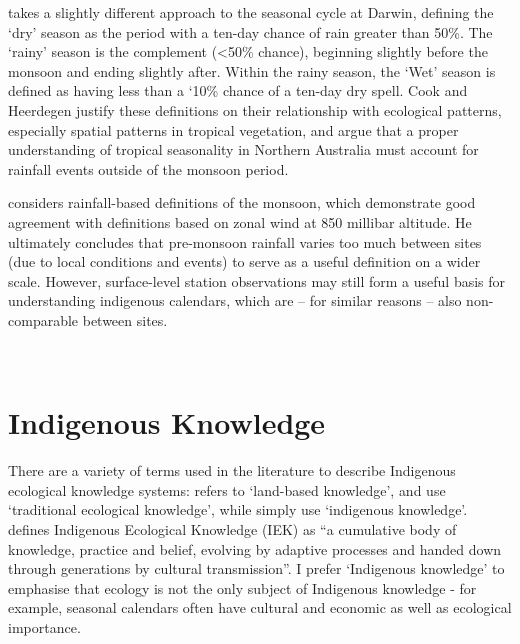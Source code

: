 \citet{cook2001} takes a slightly different approach to the seasonal cycle at
Darwin, defining the `dry' season as the period with a ten-day chance of rain
greater than 50\%.  The `rainy' season is the complement (\textless50\% chance),
beginning slightly before the monsoon and ending slightly after.  Within the
rainy season, the `Wet' season is defined as having less than a `10\% chance
of a ten-day dry spell.
%
Cook and Heerdegen justify these definitions on their relationship with
ecological patterns, especially spatial patterns in tropical vegetation,
and argue that a proper understanding of tropical seasonality in Northern
Australia must account for rainfall events outside of the monsoon period.

\citet{holland1985} considers rainfall-based definitions of the
monsoon, which demonstrate good agreement with definitions based on zonal
wind at 850 millibar altitude.  He ultimately concludes that pre-monsoon
rainfall varies too much between sites (due to local conditions and events)
to serve as a useful definition on a wider scale.
%
However, surface-level station observations may still form a useful basis for
understanding indigenous calendars, which are -- for similar reasons -- also
non-comparable between sites.

~\\






\section{Indigenous Knowledge}
\label{sec:lit-iek}

There are a variety of terms used in the literature to describe Indigenous
ecological knowledge systems:  \citet{clarke2009} refers to `land-based knowledge',
\citet{petheram2010} and \citet{turner2009} use `traditional ecological
knowledge', while \citet{cochran2015} simply use `indigenous knowledge'.
\citet{berkes2012} defines Indigenous Ecological Knowledge (IEK) as ``a cumulative
body of knowledge, practice and belief, evolving by adaptive processes and
handed down through generations by cultural transmission''.  I prefer
`Indigenous knowledge' to emphasise that ecology is not the only subject of
Indigenous knowledge - for example, seasonal calendars often have cultural and
economic as well as ecological importance.

